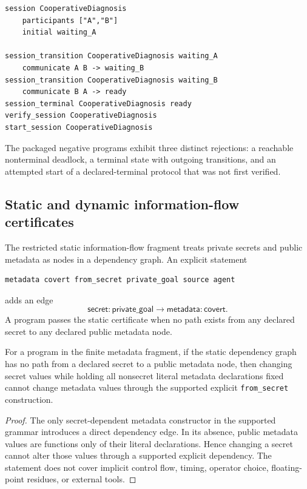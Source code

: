 \begin{lstlisting}[style=osl,caption={A finite protocol whose terminal state is verified before execution.}]
session CooperativeDiagnosis
    participants ["A","B"]
    initial waiting_A

session_transition CooperativeDiagnosis waiting_A
    communicate A B -> waiting_B
session_transition CooperativeDiagnosis waiting_B
    communicate B A -> ready
session_terminal CooperativeDiagnosis ready
verify_session CooperativeDiagnosis
start_session CooperativeDiagnosis
\end{lstlisting}

The packaged negative programs exhibit three distinct rejections: a reachable nonterminal deadlock, a terminal state with outgoing transitions, and an attempted start of a declared-terminal protocol that was not first verified.

\subsection{Static and dynamic information-flow certificates}

The restricted static information-flow fragment treats private secrets and public metadata as nodes in a dependency graph.  An explicit statement
\begin{lstlisting}[style=osl,numbers=none]
metadata covert from_secret private_goal source agent
\end{lstlisting}
adds an edge
\[
\mathsf{secret:private\_goal}\to\mathsf{metadata:covert}.
\]
A program passes the static certificate when no path exists from any declared secret to any declared public metadata node.

\begin{theorem}
For a program in the finite metadata fragment, if the static dependency graph has no path from a declared secret to a public metadata node, then changing secret values while holding all nonsecret literal metadata declarations fixed cannot change metadata values through the supported explicit \texttt{from\_secret} construction.
\end{theorem}

\begin{proof}
The only secret-dependent metadata constructor in the supported grammar introduces a direct dependency edge.  In its absence, public metadata values are functions only of their literal declarations.  Hence changing a secret cannot alter those values through a supported explicit dependency.  The statement does not cover implicit control flow, timing, operator choice, floating-point residues, or external tools.  \qedhere
\end{proof}

